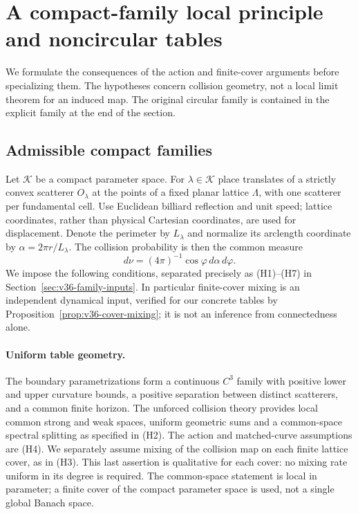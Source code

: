 \section{A compact-family local principle and noncircular tables}
\label{sec:compact-family-local-principle}
We formulate the consequences of the action and finite-cover arguments
before specializing them. The hypotheses concern collision geometry,
not a local limit theorem for an induced map. The original circular
family is contained in the explicit family at the end of the section.

\subsection{Admissible compact families}
Let $\mathcal K$ be a compact parameter space. For $\lambda\in\mathcal K$
place translates of a strictly convex scatterer $O_\lambda$ at the
points of a fixed planar lattice $\Lambda$, with one scatterer per
fundamental cell. Use Euclidean billiard reflection and unit speed;
lattice coordinates, rather than physical Cartesian coordinates, are
used for displacement. Denote the perimeter by $L_\lambda$ and
normalize its arclength coordinate by $\alpha=2\pi r/L_\lambda$.
The collision probability is then the common measure
\[
 d\nu=(4\pi)^{-1}\cos\varphi\,d\alpha\,d\varphi.
\]
We impose the following conditions, separated precisely as
\textup{(H1)--(H7)} in Section~\ref{sec:v36-family-inputs}. In particular
finite-cover mixing is an independent dynamical input, verified for
our concrete tables by Proposition~\ref{prop:v36-cover-mixing}; it is
not an inference from connectedness alone.

\paragraph{Uniform table geometry.}
The boundary parametrizations form a continuous $C^3$ family with
positive lower and upper curvature bounds, a positive separation
between distinct scatterers, and a common finite horizon. The unforced collision theory provides local common strong and weak
spaces, uniform geometric sums and a common-space spectral splitting
as specified in \textup{(H2)}. The action and matched-curve assumptions
are \textup{(H4)}. We separately assume mixing of the collision map on
each finite lattice cover, as in \textup{(H3)}. This last assertion is
qualitative for each cover: no mixing rate uniform in its degree is
required. The common-space statement is local in parameter; a finite
cover of the compact parameter space is used, not a single global
Banach space.

